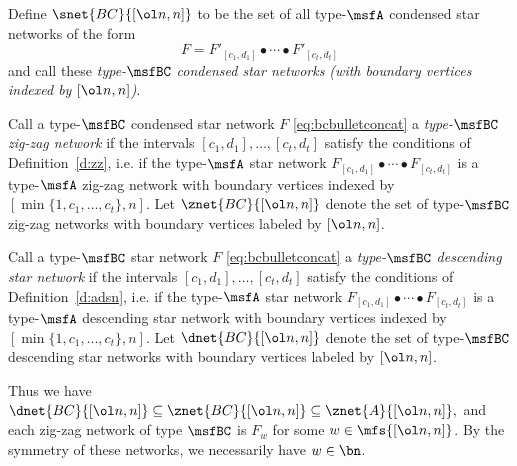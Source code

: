 \begin{defn}\label{d:bcstarnet}
  Define $\snet{BC}{[\ol n, n]}$ to be
  the set of all type-$\msfA$ condensed star networks of the form
\begin{equation}\label{eq:bcbulletconcat}
  F = F'_{[c_1,d_1]} \bullet \cdots \bullet F'_{[c_t,d_t]}
  \end{equation}
and call these
{\em type-$\msfBC$ condensed star networks
  (with boundary vertices indexed by $[\ol n,n]$)}.
\end{defn}
\begin{defn}\label{d:bczzn}
Call a type-$\msfBC$ condensed star network $F$ \eqref{eq:bcbulletconcat} a
{\em type-$\msfBC$ zig-zag network} if
the intervals $[c_1,d_1],\dotsc,[c_t,d_t]$
satisfy the conditions of Definition~\ref{d:zz},
i.e. if the type-$\msfA$ star network
$F_{[c_1,d_1]} \bullet \cdots \bullet F_{[c_t,d_t]}$
is a type-$\msfA$ zig-zag network with boundary vertices indexed by
$[ \min\{1,c_1,\dotsc,c_t\}, n]$.
Let $\znet{BC}{[\ol n,n]}$
denote the set of type-$\msfBC$ zig-zag networks with boundary vertices
labeled by $[\ol n,n]$.
\end{defn}
\begin{defn}\label{d:bcdsn}
Call a type-$\msfBC$ star network $F$ \eqref{eq:bcbulletconcat} a
{\em type-$\msfBC$ descending star network} if
the intervals $[c_1,d_1],\dotsc,[c_t,d_t]$
satisfy the conditions of Definition~\ref{d:adsn},
i.e. if the type-$\msfA$ star network
$F_{[c_1,d_1]} \bullet \cdots \bullet F_{[c_t,d_t]}$
is a type-$\msfA$ descending star network with boundary vertices indexed by
$[ \min\{1, c_1,\dotsc,c_t\}, n]$.
Let $\dnet{BC}{[\ol n,n]}$
denote the set of type-$\msfBC$ descending star
networks with boundary vertices
labeled by $[\ol n,n]$.
\end{defn}
Thus we have $\dnet{BC}{[\ol n,n]} \subseteq \znet{BC}{[\ol n,n]}
\subseteq \znet{A}{[\ol n,n]},$
and each zig-zag network of type $\msfBC$
is $F_w$ for some $w \in \mfs{[\ol n, n]}$.
By the symmetry of these networks, we necessarily have $w \in \bn$. 

